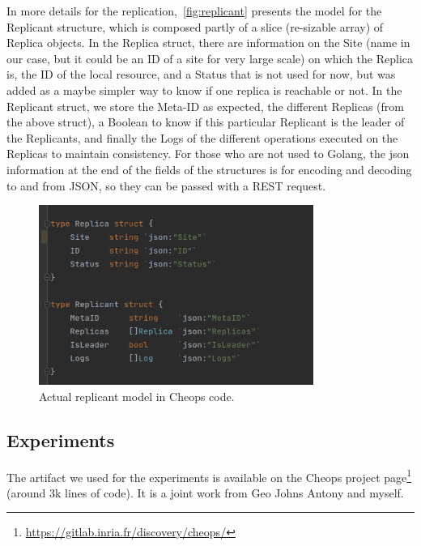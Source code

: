 In more details for the replication,~\autoref{fig:replicant} presents
the model for the Replicant structure, which is composed partly of a
slice (re-sizable array) of Replica objects.
%
In the Replica struct, there are information on the Site (name in our
case, but it could be an ID of a site for very large scale) on which
the Replica is, the ID of the local resource, and a Status that is not
used for now, but was added as a maybe simpler way to know if one
replica is reachable or not.
%
In the Replicant struct, we store the Meta-ID as expected, the
different Replicas (from the above struct), a Boolean to know if this
particular Replicant is the leader of the Replicants, and finally the
Logs of the different operations executed on the Replicas to maintain
consistency.
%
For those who are not used to Golang, the json information at the end
of the fields of the structures is for encoding and decoding to and
from JSON, so they can be passed with a REST request.




\begin{figure}
  \centering
  \includegraphics[width=0.8\textwidth]{figs/png/replicant-model}
  \caption{Actual replicant model in Cheops code.}
  \label{fig:replicant}
\end{figure}




\subsection{Experiments}

The artifact we used for the experiments is available on the Cheops
project page\footnote{\url{https://gitlab.inria.fr/discovery/cheops/}}
(around 3k lines of code).
%
It is a joint work from Geo Johns Antony and myself.


